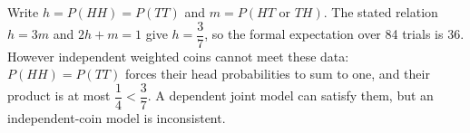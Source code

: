 Write $h=P(HH)=P(TT)$ and $m=P(HT\text{ or }TH)$. The stated relation $h=3m$ and $2h+m=1$ give $h=\dfrac{3}{7}$, so the formal expectation over 84 trials is $\boxed{36}$. However independent weighted coins cannot meet these data: $P(HH)=P(TT)$ forces their head probabilities to sum to one, and their product is at most $\dfrac{1}{4}<\dfrac{3}{7}$. A dependent joint model can satisfy them, but an independent-coin model is inconsistent.
